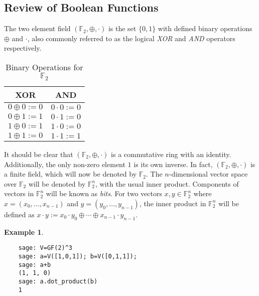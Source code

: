 \documentclass[english]{article}
\def\gftwo{\mathbb{F}_2}
\theoremstyle{plain}
\theoremstyle{definition}
\newtheorem{example}[theorem]{Example}
\theoremstyle{remark}
\begin{document}
\subsection{Review of Boolean Functions}
\par The two element field $(\gftwo,\oplus,\cdot)$ is the set $\{0,1\}$
with defined binary operations $\oplus$ and $\cdot$, also commonly referred
to as the logical {\em XOR} and {\em AND} operators respectively.
\begin{table}[h!]
  \centering
  \begin{tabular}{|c|c|}
    \hline
    XOR&AND\\
    \hline
    $0\oplus0:=0$&$0\cdot0:=0$\\
    $0\oplus1:=1$&$0\cdot1:=0$\\
    $1\oplus0:=1$&$1\cdot0:=0$\\
    $1\oplus1:=0$&$1\cdot1:=1$\\
    \hline
  \end{tabular}
  \caption{Binary Operations for $\gftwo$}
  \label{tab:GF(2)}
\end{table}
\par It should be clear that $(\gftwo,\oplus,\cdot)$ is a commutative ring
with an identity. Additionally, the only non-zero element $1$ is its own
inverse. In fact, $(\gftwo,\oplus,\cdot)$ is a finite field, which will now
be denoted by $\gftwo$. The $n$-dimensional vector space over $\gftwo$ will
be denoted by $\gftwo^n$, with the usual inner product. Components of vectors in
$\gftwo^n$ will be known as {\em bits}.
For two vectors $x,y\in\gftwo^n$ where $x=(x_0,\dots,x_{n-1})$ and
$y=(y_0,\dots,y_{n-1})$, the inner product in $\gftwo^n$ will be defined
as $x\cdot y:=\allowbreak x_0\cdot y_0 \oplus\allowbreak
\cdots \oplus\allowbreak x_{n-1}\cdot y_{n-1}$.

\begin{example}
  \ 
  \begin{lstlisting}
    sage: V=GF(2)^3
    sage: a=V([1,0,1]); b=V([0,1,1]);
    sage: a+b
    (1, 1, 0)
    sage: a.dot_product(b)
    1
  \end{lstlisting}
\end{example}
\end{document}
